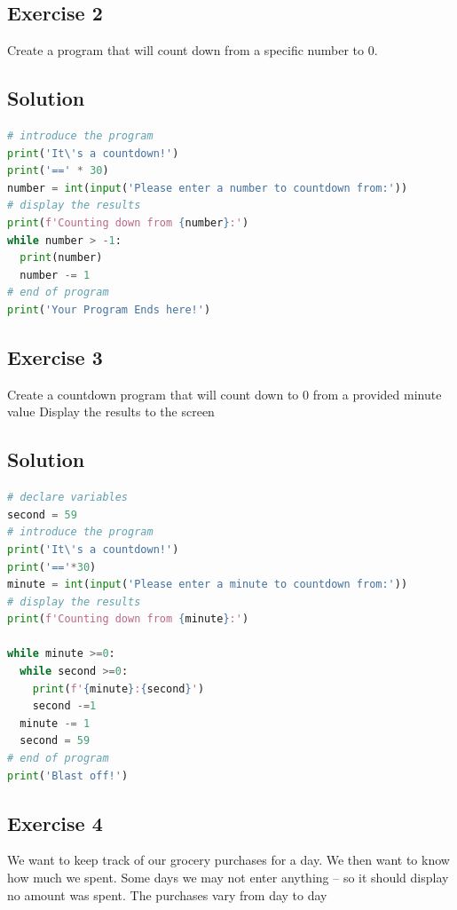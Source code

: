 \documentclass{article}
\begin{document}
\subsection{Exercise 2}
Create a program that will count down from a specific number to 0.
\subsection*{Solution}
\begin{lstlisting}[language=python]
# introduce the program
print('It\'s a countdown!')
print('==' * 30)
number = int(input('Please enter a number to countdown from:'))
# display the results
print(f'Counting down from {number}:')
while number > -1:
  print(number)
  number -= 1
# end of program
print('Your Program Ends here!')
\end{lstlisting}
\subsection{Exercise 3}
Create a countdown program that will count down to 0 from a provided minute value Display the results to the screen
\subsection*{Solution}
\begin{lstlisting}[language=python]
# declare variables
second = 59 
# introduce the program 
print('It\'s a countdown!') 
print('=='*30) 
minute = int(input('Please enter a minute to countdown from:')) 
# display the results 
print(f'Counting down from {minute}:') 

while minute >=0:
  while second >=0:
    print(f'{minute}:{second}')
    second -=1 
  minute -= 1
  second = 59
# end of program 
print('Blast off!')
\end{lstlisting}
\subsection{Exercise 4}
We want to keep track of our grocery purchases for a day. We then want to know how much we spent. Some days we may not enter anything – so it should display no amount was spent. The purchases vary from day to day
\end{document}

